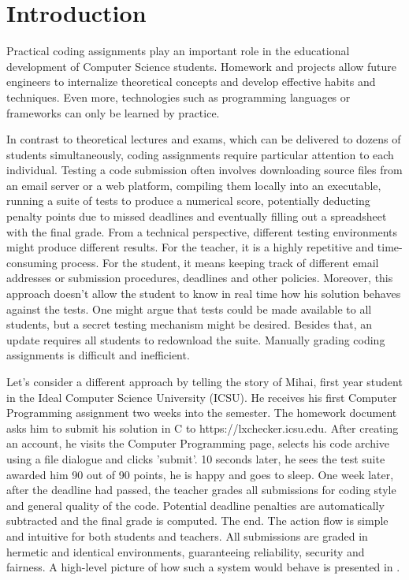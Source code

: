 \chapter{Introduction}
\label{chapter:intro}

Practical coding assignments play an important role in the educational development of Computer Science students. Homework and projects allow future engineers to internalize theoretical concepts and develop effective habits and techniques. Even more, technologies such as programming languages or frameworks can only be learned by practice.

In contrast to theoretical lectures and exams, which can be delivered to dozens of students simultaneously, coding assignments require particular attention to each individual. Testing a code submission often involves downloading source files from an email server or a web platform, compiling them locally into an executable, running a suite of tests to produce a numerical score, potentially deducting penalty points due to missed deadlines and eventually filling out a spreadsheet with the final grade. From a technical perspective, different testing environments might produce different results. For the teacher, it is a highly repetitive and time-consuming process. For the student, it means keeping track of different email addresses or submission procedures, deadlines and other policies. Moreover, this approach doesn't allow the student to know in real time how his solution behaves against the tests. One might argue that tests could be made available to all students, but a secret testing mechanism might be desired. Besides that, an update requires all students to redownload the suite. Manually grading coding assignments is difficult and inefficient.

Let's consider a different approach by telling the story of Mihai, first year student in the Ideal Computer Science University (ICSU). He receives his first Computer Programming assignment two weeks into the semester. The homework document asks him to submit his solution in C to https://lxchecker.icsu.edu. After creating an account, he visits the Computer Programming page, selects his code archive using a file dialogue and clicks 'submit'. 10 seconds later, he sees the test suite awarded him 90 out of 90 points, he is happy and goes to sleep. One week later, after the deadline had passed, the teacher grades all submissions for coding style and general quality of the code. Potential deadline penalties are automatically subtracted and the final grade is computed. The end. The action flow is simple and intuitive for both students and teachers. All submissions are graded in hermetic and identical environments, guaranteeing reliability, security and fairness. A high-level picture of how such a system would behave is presented in .

